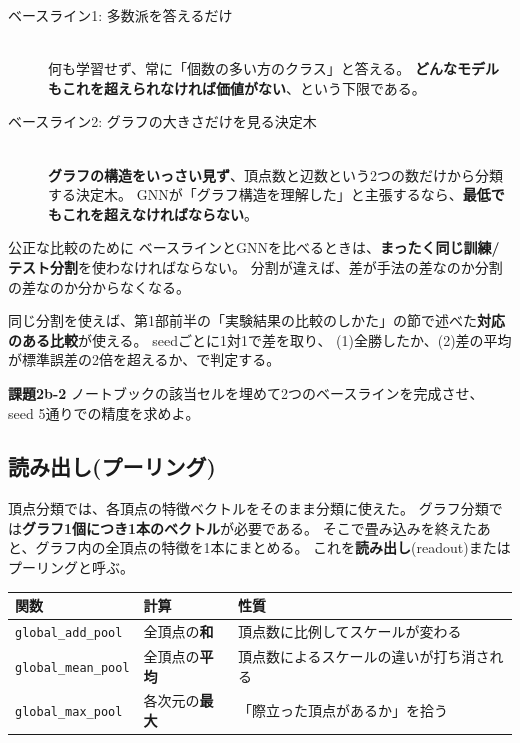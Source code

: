 \documentclass[11pt,a4paper]{jsarticle}
\begin{document}
\begin{description}
\item[ベースライン1: 多数派を答えるだけ] \mbox{}\\
何も学習せず、常に「個数の多い方のクラス」と答える。
\textbf{どんなモデルもこれを超えられなければ価値がない}、という下限である。

\item[ベースライン2: グラフの大きさだけを見る決定木] \mbox{}\\
\textbf{グラフの構造をいっさい見ず}、頂点数と辺数という2つの数だけから分類する決定木。
GNNが「グラフ構造を理解した」と主張するなら、\textbf{最低でもこれを超えなければならない}。
\end{description}

\begin{itembox}[l]{公正な比較のために}
ベースラインとGNNを比べるときは、\textbf{まったく同じ訓練/テスト分割}を使わなければならない。
分割が違えば、差が手法の差なのか分割の差なのか分からなくなる。

同じ分割を使えば、第1部前半の「実験結果の比較のしかた」の節で述べた\textbf{対応のある比較}が使える。
seedごとに1対1で差を取り、
(1)全勝したか、(2)差の平均が標準誤差の2倍を超えるか、で判定する。
\end{itembox}

\begin{screen}
\textbf{課題2b-2} \quad ノートブックの該当セルを埋めて2つのベースラインを完成させ、
seed 5通りでの精度を求めよ。
\end{screen}

\subsection{読み出し(プーリング)}

頂点分類では、各頂点の特徴ベクトルをそのまま分類に使えた。
グラフ分類では\textbf{グラフ1個につき1本のベクトル}が必要である。
そこで畳み込みを終えたあと、グラフ内の全頂点の特徴を1本にまとめる。
これを\textbf{読み出し}(readout)またはプーリングと呼ぶ。

\begin{center}
\begin{tabular}{|l|l|p{6.5cm}|}
\hline
関数 & 計算 & 性質 \\
\hline\hline
\verb|global_add_pool|  & 全頂点の\textbf{和}   & 頂点数に比例してスケールが変わる \\
\hline
\verb|global_mean_pool| & 全頂点の\textbf{平均} & 頂点数によるスケールの違いが打ち消される \\
\hline
\verb|global_max_pool|  & 各次元の\textbf{最大} & 「際立った頂点があるか」を拾う \\
\hline
\end{tabular}
\end{center}
\end{document}
